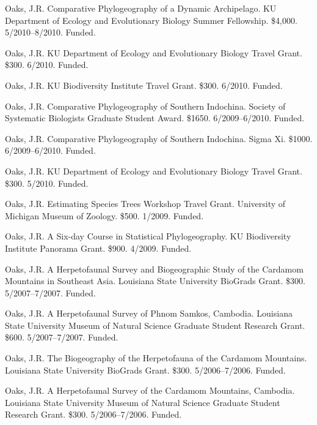\documentclass[10pt]{article}
\newcommand{\ignore}[1]{}
\newcommand{\myHangIndent}{\hangindent=5mm}
\begin{document}
\ignore{
\myHangIndent
Oaks, J.R.
Comparative Phylogeography of a Dynamic Archipelago.
KU Graduate Studies Summer Research Fellowship.
\$4,000.
5/2010--8/2010.
Not funded.
}
\myHangIndent
Oaks, J.R.
Comparative Phylogeography of a Dynamic Archipelago.
KU Department of Ecology and Evolutionary Biology Summer Fellowship.
\$4,000.
5/2010--8/2010.
Funded.

\myHangIndent
Oaks, J.R.
KU Department of Ecology and Evolutionary Biology Travel Grant.
\$300.
6/2010.
Funded.

\myHangIndent
Oaks, J.R.
KU Biodiversity Institute Travel Grant.
\$300.
6/2010.
Funded.

\myHangIndent
Oaks, J.R.
Comparative Phylogeography of Southern Indochina.
Society of Systematic Biologists Graduate Student Award.
\$1650.
6/2009--6/2010.
Funded.

\myHangIndent
Oaks, J.R.
Comparative Phylogeography of Southern Indochina.
Sigma Xi.
\$1000.
6/2009--6/2010.
Funded.

\ignore{
\myHangIndent
Oaks, J.R.
Comparative Phylogeography of Southern Indochina.
The Society for the Study of Amphibians and Reptiles Dean E. Metter Award.
\$800.
6/2009--6/2010.
Not funded.
}
\myHangIndent
Oaks, J.R.
KU Department of Ecology and Evolutionary Biology Travel Grant.
\$300.
5/2010.
Funded.

\myHangIndent
Oaks, J.R.
Estimating Species Trees Workshop Travel Grant.
University of Michigan Museum of Zoology.
\$500.
1/2009.
Funded.

\myHangIndent
Oaks, J.R.
A Six-day Course in Statistical Phylogeography.
KU Biodiversity Institute Panorama Grant.
\$900.
4/2009.
Funded.

\myHangIndent
Oaks, J.R.
A Herpetofaunal Survey and Biogeographic Study of the Cardamom Mountains in
Southeast Asia.
Louisiana State University BioGrads Grant.
\$300.
5/2007--7/2007.
Funded.

\myHangIndent
Oaks, J.R.
A Herpetofaunal Survey of Phnom Samkos, Cambodia.
Louisiana State University Museum of Natural Science Graduate Student Research
Grant.
\$600.
5/2007--7/2007.
Funded.

\myHangIndent
Oaks, J.R.
The Biogeography of the Herpetofauna of the Cardamom Mountains.
Louisiana State University BioGrads Grant.
\$300.
5/2006--7/2006.
Funded.

\myHangIndent
Oaks, J.R.
A Herpetofaunal Survey of the Cardamom Mountains, Cambodia.
Louisiana State University Museum of Natural Science Graduate Student Research
Grant.
\$300.
5/2006--7/2006.
Funded.
\end{document}
